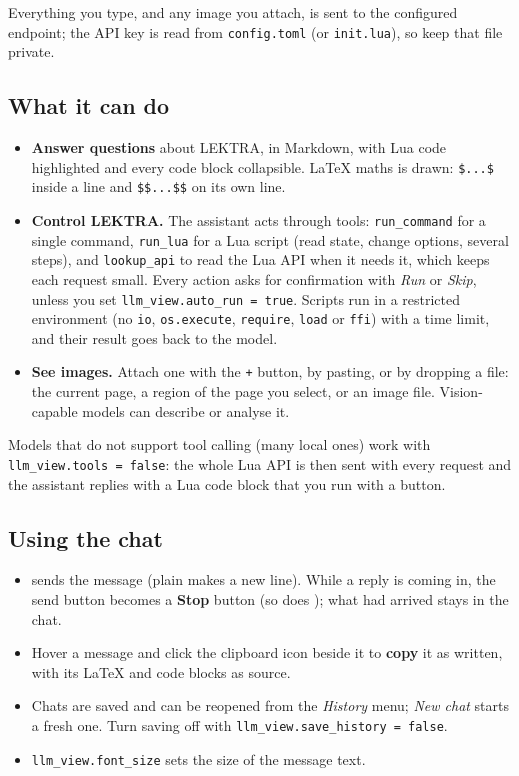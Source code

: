 \documentclass[a4paper,12pt]{article}
\begin{document}
Everything you type, and any image you attach, is sent to the configured endpoint; the API key is read from \texttt{config.\allowbreak{}toml} (or \texttt{init.\allowbreak{}lua}), so keep that file private.

\subsection{What it can do}

\begin{itemize}[leftmargin=*]
    \item \textbf{Answer questions} about LEKTRA, in Markdown, with Lua code highlighted and every code block collapsible. LaTeX maths is drawn: \texttt{\$...\$} inside a line and \texttt{\$\$...\$\$} on its own line.
    \item \textbf{Control LEKTRA.} The assistant acts through tools: \texttt{run\_\allowbreak{}command} for a single command, \texttt{run\_\allowbreak{}lua} for a Lua script (read state, change options, several steps), and \texttt{lookup\_\allowbreak{}api} to read the Lua API when it needs it, which keeps each request small. Every action asks for confirmation with \textit{Run} or \textit{Skip}, unless you set \texttt{llm\_\allowbreak{}view.auto\_\allowbreak{}run = true}. Scripts run in a restricted environment (no \texttt{io}, \texttt{os.\allowbreak{}execute}, \texttt{require}, \texttt{load} or \texttt{ffi}) with a time limit, and their result goes back to the model.
    \item \textbf{See images.} Attach one with the \texttt{+} button, by pasting, or by dropping a file: the current page, a region of the page you select, or an image file. Vision-capable models can describe or analyse it.
\end{itemize}

Models that do not support tool calling (many local ones) work with \texttt{llm\_\allowbreak{}view.tools = false}: the whole Lua API is then sent with every request and the assistant replies with a Lua code block that you run with a button.

\subsection{Using the chat}

\begin{itemize}[leftmargin=*]
    \item {} sends the message (plain  makes a new line). While a reply is coming in, the send button becomes a \textbf{Stop} button (so does ); what had arrived stays in the chat.
    \item Hover a message and click the clipboard icon beside it to \textbf{copy} it as written, with its LaTeX and code blocks as source.
    \item Chats are saved and can be reopened from the \textit{History} menu; \textit{New chat} starts a fresh one. Turn saving off with \texttt{llm\_\allowbreak{}view.save\_\allowbreak{}history = false}.
    \item \texttt{llm\_\allowbreak{}view.font\_\allowbreak{}size} sets the size of the message text.
\end{itemize}
\end{document}

